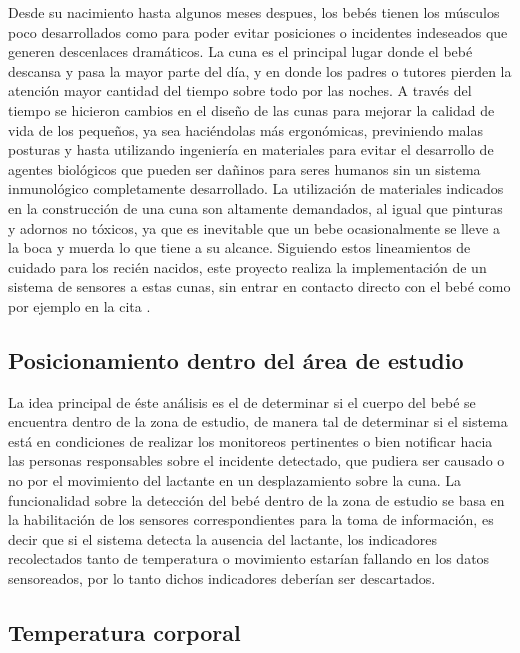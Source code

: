 \documentclass{IEEEtran}
\begin{document}
			Desde su nacimiento hasta algunos meses despues, los bebés tienen los músculos poco desarrollados como para poder evitar posiciones o incidentes indeseados que generen descenlaces dramáticos. La cuna es el principal lugar donde el bebé descansa y pasa la mayor parte del día, y en donde los padres o tutores pierden la atención mayor cantidad del tiempo sobre todo por las noches. A través del tiempo se hicieron cambios en el diseño de las cunas para mejorar la calidad de vida de los pequeños, ya sea haciéndolas más ergonómicas, previniendo malas posturas y hasta utilizando ingeniería en materiales para evitar el desarrollo de agentes biológicos que pueden ser dañinos para seres humanos sin un sistema inmunológico completamente desarrollado. La utilización de materiales indicados en la construcción de una cuna son altamente demandados, al igual que pinturas y adornos no tóxicos, ya que es inevitable que un bebe ocasionalmente se lleve a la boca y muerda lo que tiene a su alcance. Siguiendo estos lineamientos de cuidado para los recién nacidos, este proyecto realiza la implementación de un sistema de sensores a estas cunas, sin entrar en contacto directo con el bebé como por ejemplo en la cita \cite{broussard2002baby}.
		
		\subsection{Posicionamiento dentro del área de estudio}

			La idea principal de éste análisis es el de determinar si el cuerpo del bebé se encuentra dentro de la zona de estudio, de manera tal de determinar si el sistema está en condiciones de realizar los monitoreos pertinentes o bien notificar hacia las personas responsables sobre el incidente detectado, que pudiera ser causado o no por el movimiento del lactante en un desplazamiento sobre la cuna. La funcionalidad sobre la detección del bebé dentro de la zona de estudio se basa en la habilitación de los sensores correspondientes para la toma de información, es decir que si el sistema detecta la ausencia del lactante, los indicadores recolectados tanto de temperatura o movimiento estarían fallando en los datos sensoreados, por lo tanto dichos indicadores deberían ser descartados.
		
		\subsection{Temperatura corporal}
\end{document}
